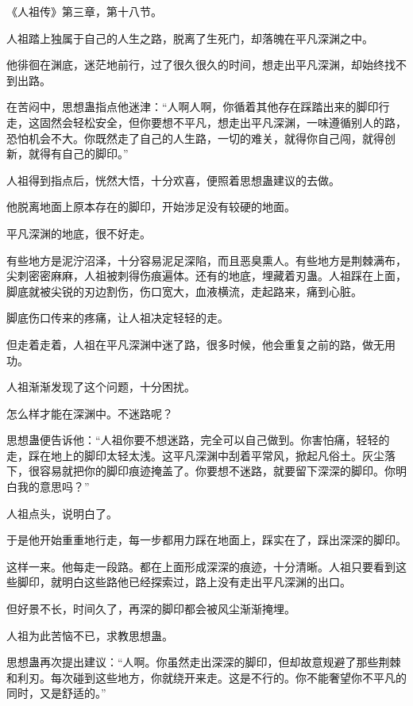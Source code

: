 
\begin{this_body}

《人祖传》第三章，第十八节。

人祖踏上独属于自己的人生之路，脱离了生死门，却落魄在平凡深渊之中。

他徘徊在渊底，迷茫地前行，过了很久很久的时间，想走出平凡深渊，却始终找不到出路。

在苦闷中，思想蛊指点他迷津：“人啊人啊，你循着其他存在踩踏出来的脚印行走，这固然会轻松安全，但你要想不平凡，想走出平凡深渊，一味遵循别人的路，恐怕机会不大。你既然走了自己的人生路，一切的难关，就得你自己闯，就得创新，就得有自己的脚印。”

人祖得到指点后，恍然大悟，十分欢喜，便照着思想蛊建议的去做。

他脱离地面上原本存在的脚印，开始涉足没有较硬的地面。

平凡深渊的地底，很不好走。

有些地方是泥泞沼泽，十分容易泥足深陷，而且恶臭熏人。有些地方是荆棘满布，尖刺密密麻麻，人祖被刺得伤痕遍体。还有的地底，埋藏着刃蛊。人祖踩在上面，脚底就被尖锐的刃边割伤，伤口宽大，血液横流，走起路来，痛到心脏。

脚底伤口传来的疼痛，让人祖决定轻轻的走。

但走着走着，人祖在平凡深渊中迷了路，很多时候，他会重复之前的路，做无用功。

人祖渐渐发现了这个问题，十分困扰。

怎么样才能在深渊中。不迷路呢？

思想蛊便告诉他：“人祖你要不想迷路，完全可以自己做到。你害怕痛，轻轻的走，踩在地上的脚印太轻太浅。这平凡深渊中刮着平常风，掀起凡俗土。灰尘落下，很容易就把你的脚印痕迹掩盖了。你要想不迷路，就要留下深深的脚印。你明白我的意思吗？”

人祖点头，说明白了。

于是他开始重重地行走，每一步都用力踩在地面上，踩实在了，踩出深深的脚印。

这样一来。他每走一段路。都在上面形成深深的痕迹，十分清晰。人祖只要看到这些脚印，就明白这些路他已经探索过，路上没有走出平凡深渊的出口。

但好景不长，时间久了，再深的脚印都会被风尘渐渐掩埋。

人祖为此苦恼不已，求教思想蛊。

思想蛊再次提出建议：“人啊。你虽然走出深深的脚印，但却故意规避了那些荆棘和利刃。每次碰到这些地方，你就绕开来走。这是不行的。你不能奢望你不平凡的同时，又是舒适的。”


\end{this_body}

